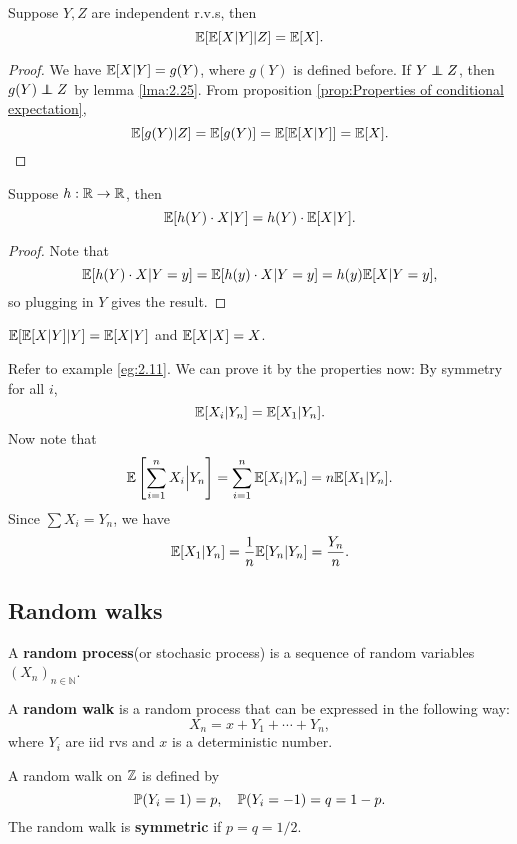 \begin{proposition}
    Suppose $Y,Z$ are independent r.v.s, then 
    \[
        {\mathbb{E}}[{\mathbb{E}}[X|Y]|Z] = {\mathbb{E}}[X].
    \]
\end{proposition}
\begin{proof}
    We have $ {\mathbb{E}}[X|Y] = g(Y) $, where $g(Y)$ is defined before. If $ Y \independent Z $, then $ g(Y) \independent Z $ by lemma \ref{lma:2.25}. From proposition \ref{prop:Properties of conditional expectation}, 
    \[
        {\mathbb{E}}[g(Y)|Z] = {\mathbb{E}}[g(Y)] = {\mathbb{E}}[{\mathbb{E}}[X|Y]] = {\mathbb{E}}[X].\qedhere
    \]
\end{proof}

\begin{proposition}
    Suppose $h:{\mathbb{R}}\to{\mathbb{R}}$, then 
    \[
        {\mathbb{E}}[h(Y) \cdot X|Y] = h(Y) \cdot {\mathbb{E}}[X|Y].
    \]
\end{proposition}
\begin{proof}
    Note that 
    \[
        {\mathbb{E}}[h(Y)\cdot X|Y=y]={\mathbb{E}}[h(y)\cdot X|Y=y] = h(y){\mathbb{E}}[X|Y=y],
    \]
    so plugging in $Y$ gives the result.
\end{proof}
\begin{corollary}
    $ {\mathbb{E}}[{\mathbb{E}}[X|Y]|Y]={\mathbb{E}}[X|Y] $ and $ {\mathbb{E}}[X|X]=X $.
\end{corollary}

\begin{example}
    Refer to example \ref{eg:2.11}. We can prove it by the properties now: By symmetry for all $i$, 
    \[
        {\mathbb{E}}[X_i|Y_n]={\mathbb{E}}[X_1|Y_n].
    \]
    Now note that 
    \[
        {\mathbb{E}}\left[ \sum_{i=1}^{n}X_i\Big|Y_n \right] = \sum_{i=1}^{n}{\mathbb{E}}[X_i|Y_n] = n {\mathbb{E}}[X_1|Y_n].
    \]
    Since $ \sum X_i = Y_n $, we have 
    \[
        {\mathbb{E}}[X_1|Y_n] = \frac{1}{n}{\mathbb{E}}[Y_n|Y_n] = \frac{Y_n}{n}.\qedhere
    \]
\end{example}

\subsection{Random walks}
\begin{definition}
    A \textbf{random process}(or stochasic process) is a sequence of random variables $ (X_n)_{n\in \mathbb{N}} $.
\end{definition}
\begin{definition}
    A \textbf{random walk} is a random process that can be expressed in the following way: 
    \[
        X_n = x+Y_1+\cdots+Y_n,
    \]
    where $Y_i$ are iid rvs and $x$ is a deterministic number.
\end{definition}
\begin{definition}
    A random walk on ${\mathbb{Z}}$ is defined by 
    \[
        {\mathbb{P}}(Y_i=1) = p,\quad \mathbb{P}(Y_i=-1)=q=1-p.
    \]
    The random walk is \textbf{symmetric} if $p=q=1/2$.
\end{definition}

